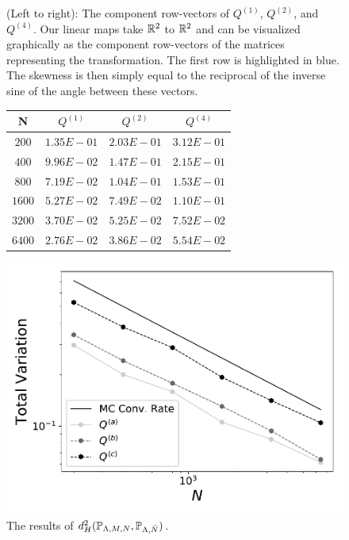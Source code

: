 \begin{figure}[h]
\begin{minipage}{.3\textwidth}
	\end{minipage}
\caption{(Left to right):  The component row-vectors of $Q^{(1)}$, $Q^{(2)}$, and $Q^{(4)}$. Our linear maps take $\mathbb{R}^2$ to $\mathbb{R}^2$ and can be visualized graphically as the component row-vectors of the matrices representing the transformation. The first row is highlighted in blue. The skewness is then simply equal to the reciprocal of the inverse sine of the angle between these vectors. }
\label{fig: skewmapvecs}
\end{figure}


\begin{figure}
\begin{minipage}{.5\textwidth}
\begin{table}[H]
\begin{tabular}{ c | c | c | c }
N & $Q^{(1)}$ & $Q^{(2)}$ & $Q^{(4)}$\\ \hline \hline
$200$ & $1.35E-01$ & $2.03E-01$ & $3.12E-01$\\ \hline 
 
$400$ & $9.96E-02$ & $1.47E-01$ & $2.15E-01$\\ \hline 
 
$800$ & $7.19E-02$ & $1.04E-01$ & $1.53E-01$\\ \hline 
 
$1600$ & $5.27E-02$ & $7.49E-02$ & $1.10E-01$\\ \hline 
 
$3200$ & $3.70E-02$ & $5.25E-02$ & $7.52E-02$\\ \hline 
 
$6400$ & $2.76E-02$ & $3.86E-02$ & $5.54E-02$\\ \hline 
\end{tabular}
\end{table}
\end{minipage}
\begin{minipage}{.45\textwidth}
		\includegraphics[width=\linewidth]{./images/Plot-reg_BigN_40000_reg_M_1_rand_I_100000}
\end{minipage}
\caption{The results of $d^2_H(\mathbb{P}_{{\Lambda}, M, N}, \mathbb{P}_{{\Lambda},\bar{N}})$.}
\label{fig:M1_2d}
\end{figure}

